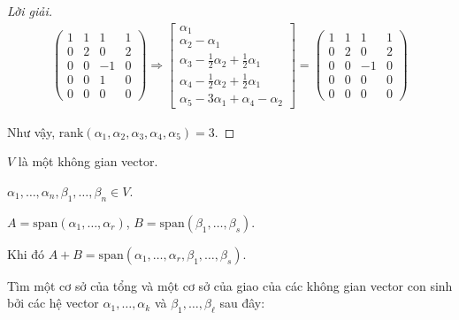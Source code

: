 \documentclass[class=linearalgebra,crop=false]{standalone}
\begin{document}
\begin{proof}[Lời giải]
\begin{align*}
        \begin{pmatrix}
            1 & 1 & 1  & 1 \\
            0 & 2 & 0  & 2 \\
            0 & 0 & -1 & 0 \\
            0 & 0 & 1  & 0 \\
            0 & 0 & 0  & 0
        \end{pmatrix}
        \Longrightarrow
        \begin{bmatrix}
            \alpha_{1}                                                 \\
            \alpha_{2}-\alpha_{1}                                      \\
            \alpha_{3}-\frac{1}{2}\alpha_{2}+\frac{1}{2}\alpha_{1}     \\
            \alpha_{4} - \frac{1}{2}\alpha_{2} + \frac{1}{2}\alpha_{1} \\
            \alpha_{5} - 3\alpha_{1} + \alpha_{4} - \alpha_{2}
        \end{bmatrix}=
        \begin{pmatrix}
            1 & 1 & 1  & 1 \\
            0 & 2 & 0  & 2 \\
            0 & 0 & -1 & 0 \\
            0 & 0 & 0  & 0 \\
            0 & 0 & 0  & 0
        \end{pmatrix}
    \end{align*}
    \par Như vậy, $\text{rank}(\alpha_{1},\alpha_{2},\alpha_{3},\alpha_{4},\alpha_{5}) = 3$.
\end{proof}


\begin{lemma}
    $V$ là một không gian vector.
    \par $\alpha_{1},\ldots,\alpha_{n},\beta_{1},\ldots,\beta_{n}\in V$.
    \par $A = \text{span}(\alpha_{1},\ldots,\alpha_{r})$, $B = \text{span}(\beta_{1},\ldots,\beta_{s})$.
    \par Khi đó $A + B = \text{span}(\alpha_{1},\ldots,\alpha_{r},\beta_{1},\ldots,\beta_{s})$.
\end{lemma}

\par Tìm một cơ sở của tổng và một cơ sở của giao của các không gian vector con sinh bởi các hệ vector $\alpha_{1},\ldots,\alpha_{k}$ và $\beta_{1},\ldots,\beta_{\ell}$ sau đây:
\end{document}
